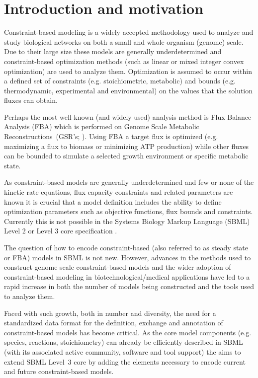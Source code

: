 
\section{ Introduction and motivation } \label{intro}

Constraint-based modeling is a widely accepted methodology used to
analyze and study biological networks on both a small and whole organism
(genome) scale. Due to their large size these models are generally
underdetermined and constraint-based optimization methods (such as linear or
mixed integer convex optimization) are used to analyze them. Optimization is
assumed to occur within a defined set of constraints (e.g. stoichiometric,
metabolic) and bounds (e.g. thermodynamic, experimental and environmental) on
the values that the solution fluxes can obtain.

Perhaps the most well known (and widely used) analysis method is Flux
Balance Analysis (FBA) which is performed on Genome Scale Metabolic
Reconstructions~(GSR's; \citealt{oberhardt_2009}). Using FBA a
target flux is optimized (e.g. maximizing a flux to biomass or
minimizing ATP production) while other fluxes can be bounded to simulate
a selected growth environment or specific metabolic state.

As constraint-based models are generally underdetermined and few or
none of the kinetic rate equations, flux capacity constraints and related
parameters are known it is crucial that a model definition includes the
ability to define optimization parameters such as objective functions, flux
bounds and constraints. Currently this is not possible in the Systems Biology
Markup Language (SBML) Level 2 or Level 3 core specification \citep{sbml,
sbml3core}.

The question of how to encode constraint-based (also referred to as
steady state or FBA) models in SBML is not new. However, advances in the
methods used to construct genome scale constraint-based models and the
wider adoption of constraint-based modeling in biotechnological/medical
applications have led to a rapid increase in both the number of models
being constructed and the tools used to analyze them.

Faced with such growth, both in number and diversity, the need for a
standardized data format for the definition, exchange and annotation of
constraint-based models has become critical. As the core model
components (e.g. species, reactions, stoichiometry) can already be
efficiently described in SBML (with its associated active community,
software and tool support) the \FBCPackage aims to extend SBML Level~3
core by adding the elements necessary to encode current and future
constraint-based models.

